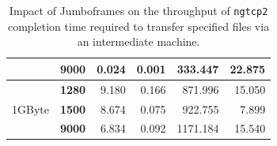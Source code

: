 \documentclass[12pt,a4paper]{report}
\begin{document}
\begin{table}[H]
\begin{tabular}{|c|l|r|r|r|r|}
                                                                                & \textbf{9000}                                                                               & 0.024                     & 0.001                                                                              & 333.447                   & 22.875                                                                             \\ \hline
\multirow{3}{*}{1GByte}                                                         & \textbf{1280}                                                                               & 9.180                     & 0.166                                                                              & 871.996                   & 15.050                                                                             \\ \cline{2-6} 
                                                                                & \textbf{1500}                                                                               & 8.674                     & 0.075                                                                              & 922.755                   & 7.899                                                                              \\ \cline{2-6} 
                                                                                & \textbf{9000}                                                                               & 6.834                     & 0.092                                                                              & 1171.184                  & 15.540                                                                             \\ \hline
\end{tabular}

    \centering
    \caption[Impact of Jumboframes for the throughput of \texttt{ngtcp2} completion time required to transfer specified files]{Impact of Jumboframes on the throughput of \texttt{ngtcp2} completion time required to transfer specified files via an intermediate machine.}
    \label{fig:Impact_of_Jumbo_frames_for_ngtcp2_throughput}
\end{table}
  

  
\end{document}
